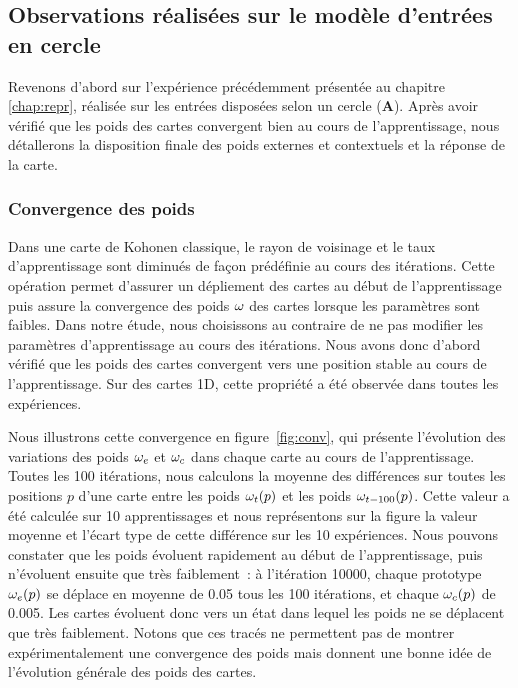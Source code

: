 \documentclass[../main]{subfiles}
\begin{document}
\subsection{Observations réalisées sur le modèle d'entrées en cercle}

Revenons d'abord sur l'expérience précédemment présentée au chapitre \ref{chap:repr}, réalisée sur les entrées disposées selon un cercle (\textbf{A}).
Après avoir vérifié que les poids des cartes convergent bien au cours de l'apprentissage, nous détallerons la disposition finale des poids externes et contextuels et la réponse de la carte.

\subsubsection{Convergence des poids}

Dans une carte de Kohonen classique, le rayon de voisinage et le taux d'apprentissage sont diminués de façon prédéfinie au cours des itérations. 
Cette opération permet d'assurer un dépliement des cartes au début de l'apprentissage puis assure la convergence des poids $\omega$ des cartes lorsque les paramètres sont faibles.
Dans notre étude, nous choisissons au contraire de ne pas modifier les paramètres d'apprentissage au cours des itérations.
Nous avons donc d'abord vérifié que les poids des cartes convergent vers une position stable au cours de l'apprentissage. Sur des cartes 1D, cette propriété a été observée dans toutes les expériences.

Nous illustrons cette convergence en figure~\ref{fig:conv}, qui présente l'évolution des variations des poids $\omega_{e}$ et $\omega_{c}$ dans chaque carte au cours de l'apprentissage. 
Toutes les 100 itérations, nous calculons la moyenne des différences sur toutes les positions $p$ d'une carte entre les poids $\omega_t(p)$ et les poids $\omega_{t-100}(p)$. 
Cette valeur a été calculée sur 10 apprentissages et nous représentons sur la figure la valeur moyenne et l'écart type de cette différence sur les 10 expériences.
Nous pouvons constater que les poids évoluent rapidement au début de l'apprentissage, puis n'évoluent ensuite que très faiblement~: à l'itération 10000, chaque prototype $\omega_e(p)$ se déplace en moyenne de 0.05 tous les 100 itérations, et chaque $\omega_c(p)$ de 0.005. Les cartes évoluent donc vers un état dans lequel les poids ne se déplacent que très faiblement.
Notons que ces tracés ne permettent pas de montrer expérimentalement une convergence des poids mais donnent une bonne idée de l'évolution générale des poids des cartes.
\end{document}

